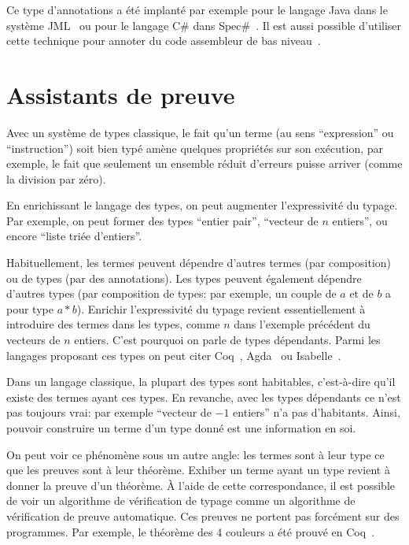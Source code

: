 Ce type d'annotations a été implanté par exemple pour le langage Java dans le
système JML~\cite{jml} ou pour le langage C\# dans Spec\#~\cite{krml136}. Il est
aussi possible d'utiliser cette technique pour annoter du code assembleur de bas
niveau~\cite{mc-hoare-logic}.

\section{Assistants de preuve}

Avec un système de types classique, le fait qu'un terme (au sens
\enquote{expression} ou \enquote{instruction}) soit bien typé amène quelques
propriétés sur son exécution, par exemple, le fait que seulement un ensemble
réduit d'erreurs puisse arriver (comme la division par zéro).

En enrichissant le langage des types, on peut augmenter l'expressivité du
typage. Par exemple, on peut former des types \enquote{entier pair},
\enquote{vecteur de $n$ entiers}, ou encore \enquote{liste triée d'entiers}.

Habituellement, les termes peuvent dépendre d'autres termes (par composition) ou
de types (par des annotations). Les types peuvent également dépendre d'autres
types (par composition de types: par exemple, un couple de $a$ et de $b$ a pour
type $a * b$). Enrichir l'expressivité du typage revient essentiellement à
introduire des termes dans les types, comme $n$ dans l'exemple précédent du
vecteurs de $n$ entiers. C'est pourquoi on parle de types dépendants. Parmi les
langages proposant ces types on peut citer Coq~\cite{coqmanual},
Agda~\cite{agdatutorial} ou Isabelle~\cite{isabelletutorial}.

Dans un langage classique, la plupart des types sont habitables, c'est-à-dire
qu'il existe des termes ayant ces types. En revanche, avec les types dépendants
ce n'est pas toujours vrai: par exemple \enquote{vecteur de $-1$ entiers} n'a
pas d'habitants. Ainsi, pouvoir construire un terme d'un type donné est une
information en soi.

On peut voir ce phénomène sous un autre angle: les termes sont à leur type ce
que les preuves sont à leur théorème. Exhiber un terme ayant un type revient à
donner la preuve d'un théorème. À l'aide de cette correspondance, il est
possible de voir un algorithme de vérification de typage comme un algorithme de
vérification de preuve automatique. Ces preuves ne portent pas forcément sur des
programmes. Par exemple, le théorème des 4 couleurs a été prouvé en
Coq~\cite{4colpap}.

